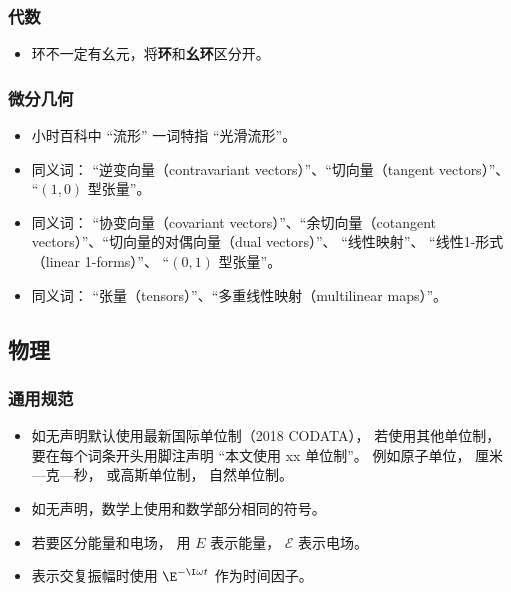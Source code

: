 \subsubsection{代数}
\begin{itemize}
\item 环不一定有幺元，将\textbf{环}和\textbf{幺环}区分开。
\end{itemize}


\subsubsection{微分几何}
\begin{itemize}
\item 小时百科中 “流形” 一词特指 “光滑流形”。
\item 同义词： “逆变向量（contravariant vectors）”、“切向量（tangent vectors）”、 “$(1, 0)$ 型张量”。
\item 同义词： “协变向量（covariant vectors）”、“余切向量（cotangent vectors）”、“切向量的对偶向量（dual vectors）”、 “线性映射”、 “线性1-形式（linear 1-forms）”、 “$(0, 1)$ 型张量”。
\item 同义词： “张量（tensors）”、“多重线性映射（multilinear maps）”。
\end{itemize}

\subsection{物理}
\subsubsection{通用规范}
\begin{itemize}
\item 如无声明默认使用最新国际单位制（2018 CODATA）， 若使用其他单位制， 要在每个词条开头用脚注声明 “本文使用 xx 单位制”。 例如原子单位， 厘米—克—秒， 或高斯单位制， 自然单位制。
\item 如无声明，数学上使用和数学部分相同的符号。
\item 若要区分能量和电场， 用 $E$ 表示能量， $\mathcal E$ 表示电场。
\item 表示交复振幅时使用 $\E^{-\I \omega t}$ 作为时间因子。
\end{itemize}

